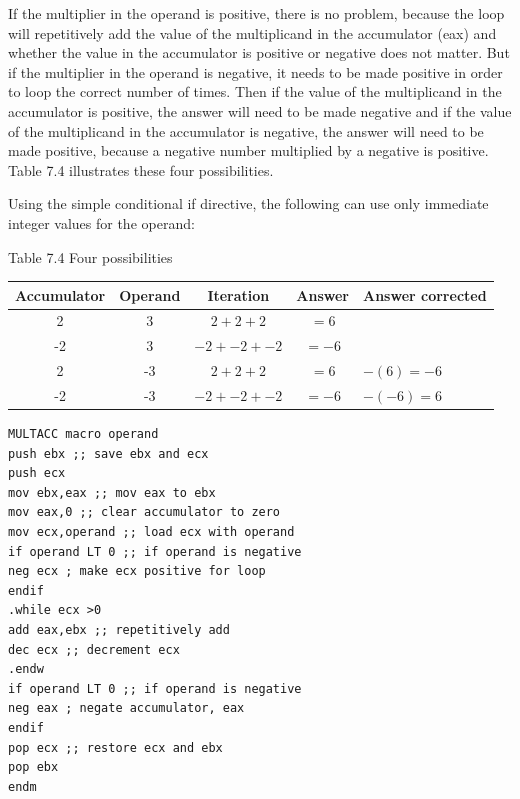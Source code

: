 \documentclass[10pt]{book}
\begin{document}
If the multiplier in the operand is positive, there is no problem, because the loop will repetitively add the value of the multiplicand in the accumulator (eax) and whether the value in the accumulator is positive or negative does not matter. But if the multiplier in the operand is negative, it needs to be made positive in order to loop the correct number of times. Then if the value of the multiplicand in the accumulator is positive, the answer will need to be made negative and if the value of the multiplicand in the accumulator is negative, the answer will need to be made positive, because a negative number multiplied by a negative is positive. Table 7.4 illustrates these four possibilities.

Using the simple conditional if directive, the following can use only immediate integer values for the operand:

Table 7.4 Four possibilities

\begin{center}
\begin{tabular}{|c|c|c|c|l|}
\hline
\textbf{Accumulator} & \textbf{Operand} & \textbf{Iteration} & \textbf{Answer} & \textbf{Answer corrected} \\
\hline
2 & 3 & $2+2+2$ & $=6$ &  \\
\hline
-2 & 3 & $-2+-2+-2$ & $=-6$ &  \\
2 & -3 & $2+2+2$ & $=6$ & $-(6)=-6$ \\
-2 & -3 & $-2+-2+-2$ & $=-6$ & $-(-6)=6$ \\
\hline
\end{tabular}
\end{center}

\begin{verbatim}
MULTACC macro operand
push ebx ;; save ebx and ecx
push ecx
mov ebx,eax ;; mov eax to ebx
mov eax,0 ;; clear accumulator to zero
mov ecx,operand ;; load ecx with operand
if operand LT 0 ;; if operand is negative
neg ecx ; make ecx positive for loop
endif
.while ecx >0
add eax,ebx ;; repetitively add
dec ecx ;; decrement ecx
.endw
if operand LT 0 ;; if operand is negative
neg eax ; negate accumulator, eax
endif
pop ecx ;; restore ecx and ebx
pop ebx
endm
\end{verbatim}
\end{document}
